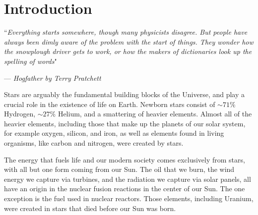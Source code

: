 \documentclass[../dissertation.tex]{subfiles}
\begin{document}
\chapter{Introduction}
\label{ch:intro}

\singlespace
\epigraph{``\emph{Everything starts somewhere, though many physicists disagree. But people have always been dimly aware of the problem with the start of things. They wonder how the snowplough driver gets to work, or how the makers of dictionaries look up the spelling of words}"}{--- \textit{Hogfather by Terry Pratchett}}

\dblspace

Stars are arguably the fundamental building blocks of the Universe, 
and play a crucial role in the existence of life on Earth. Newborn stars consist of $\sim 71 \%$ Hydrogen, $\sim 27 \%$ Helium, and a smattering of heavier elements. Almost all of the heavier elements, including those that make up the planets of our solar system, for example oxygen, silicon, and iron, as well as elements found in living organisms, like carbon and nitrogen, were created by stars. 

The energy that fuels life and our modern society comes exclusively from stars, with all but one form coming from our Sun. 
The oil that we burn, the wind energy we capture via turbines, 
and the radiation we capture via solar panels, all have an origin in the nuclear fusion reactions in the center of our Sun. 
The one exception is the fuel used in nuclear reactors. Those elements, including Uranium,  were created in stars that died before our Sun was born.





\end{document}
